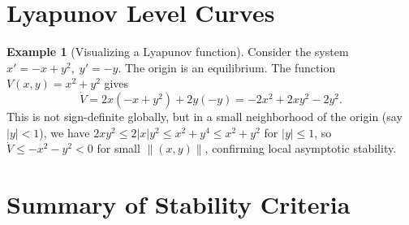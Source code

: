 \documentclass[12pt,a4paper,openany]{book}
\theoremstyle{definition}
\newtheorem{example}[definition]{Example}
\theoremstyle{plain}
\theoremstyle{remark}
\newcommand{\abs}[1]{\left|#1\right|}
\newcommand{\norm}[1]{\left\|#1\right\|}
\begin{document}
\section{Lyapunov Level Curves}
\label{sec:lyapunov-level-curves}

\begin{example}[Visualizing a Lyapunov function]
\label{ex:lyapunov-level-curves}
Consider the system \(x'=-x+y^2,\;y'=-y\). The origin is an equilibrium.
The function \(V(x,y)=x^2+y^2\) gives
\[
  \dot{V} = 2x(-x+y^2)+2y(-y) = -2x^2+2xy^2-2y^2.
\]
This is not sign-definite globally, but in a small neighborhood of the origin
(say \(\abs{y}<1\)), we have \(2xy^2\le 2\abs{x}y^2 \le x^2+y^4\le x^2+y^2\)
for \(\abs{y}\le 1\), so \(\dot{V}\le -x^2-y^2<0\) for small
\(\norm{(x,y)}\), confirming local asymptotic stability.

\begin{center}
\end{center}
\end{example}

\section{Summary of Stability Criteria}
\label{sec:stability-summary-table}
\end{document}
